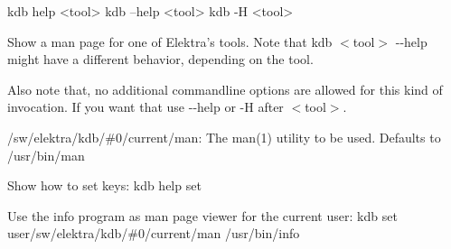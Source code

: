 
\begin{DoxyCode}
kdb help <tool>
kdb --help <tool>
kdb -H <tool>
\end{DoxyCode}


Show a man page for one of Elektra’s tools. Note that {\ttfamily kdb $<$tool$>$ -\/-\/help} might have a different behavior, depending on the tool.

Also note that, no additional commandline options are allowed for this kind of invocation. If you want that use {\ttfamily -\/-\/help} or {\ttfamily -\/H} after {\ttfamily $<$tool$>$}.


\begin{DoxyItemize}
\item {\ttfamily /sw/elektra/kdb/\#0/current/man}\+: The man(1) utility to be used. Defaults to /usr/bin/man
\end{DoxyItemize}

Show how to set keys\+: {\ttfamily kdb help set}

Use the info program as man page viewer for the current user\+: {\ttfamily kdb set user/sw/elektra/kdb/\#0/current/man /usr/bin/info} 